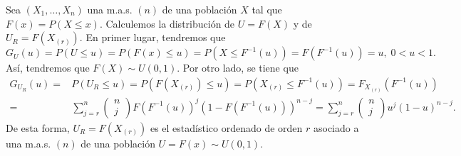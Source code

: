 \begin{eg}
Sea $\displaystyle \left(X_{1}, \ldots, X_{n}\right) $ una m.a.s. $\displaystyle \left(n\right) $ de una población $\displaystyle X $ tal que $\displaystyle F\left(x\right)= P\left(X \leq x\right) $. Calculemos la distribución de $\displaystyle U=F\left(X\right) $ y de $\displaystyle U_{R}= F\left(X_{\left(r\right)}\right) $. En primer lugar, tendremos que
\[G_{U}\left(u\right)=P\left(U \leq u \right)=P\left(F\left(x\right)\leq u\right)=P\left(X\leq F^{-1}\left(u\right)\right)=F\left(F^{-1}\left(u\right)\right) = u, \; 0 < u < 1 .\]
Así, tendremos que $\displaystyle F\left(X\right)\sim U\left(0,1\right) $. Por otro lado, se tiene que
\[
\begin{split}
	G_{U_{R}}\left(u\right)=& P\left(U_{R} \leq u\right)=P\left(F\left(X_{\left(r\right)}\right)\leq u\right) = P\left(X_{\left(r\right)} \leq F^{-1}\left(u\right)\right) = F_{X_{\left(r\right)}}\left(F^{-1}\left(u\right)\right) \\
	= & \sum^{n}_{j = r}\begin{pmatrix} n \\ j \end{pmatrix}F\left(F^{-1}\left(u\right)\right)^{j}\left(1-F\left(F^{-1}\left(u\right)\right)\right)^{n-j}=\sum^{n}_{j = r}\begin{pmatrix} n \\ j \end{pmatrix}u^{j}\left(1-u\right)^{n-j} .
\end{split}
\]
De esta forma, $\displaystyle U_{R}=F\left(X_{\left(r\right)}\right) $ es el estadístico ordenado de orden $\displaystyle r $ asociado a una m.a.s. $\displaystyle \left(n\right) $ de una población $\displaystyle U = F\left(x\right) \sim U\left(0,1\right) $. 
\end{eg}

